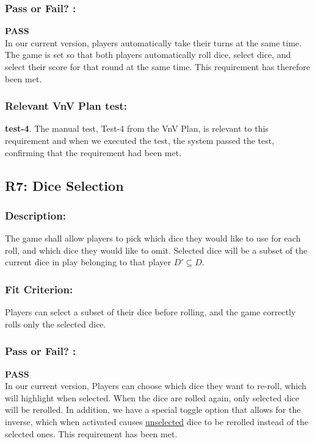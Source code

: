 \documentclass[12pt, titlepage]{article}
\begin{document}
\subsubsection*{Pass or Fail? :} 

 \noindent \textbf{PASS}\\
 
  In our current version, players automatically take their turns at the same time. The game is set so that both players automatically roll dice, select dice, and select their score for that round at the same time. This requirement has therefore been met.

\subsubsection*{Relevant VnV Plan test: } \textbf{test-4}.  The manual test, Test-4 from the VnV Plan, is relevant to this requirement and when we executed the test, the system passed the test, confirming that the requirement had been met.


\subsection{R7: Dice Selection} 
\label{R7} 

\subsubsection*{Description:} The game shall allow players to pick which dice they would like to use for each roll, and which dice they would like to omit. Selected dice will be a subset of the current dice in play belonging to that player $D' \subseteq D$.

\subsubsection*{Fit Criterion:} Players can select a subset of their dice before rolling, and the game correctly rolls only the selected dice.


\subsubsection*{Pass or Fail? :} 

 \noindent \textbf{PASS}\\
 
 In our current version, Players can choose which dice they want to re-roll, which will highlight when selected. When the dice are rolled again, only selected dice will be rerolled. In addition, we have a special toggle option that allows for the inverse, which when activated causes \underline{unselected} dice to be rerolled instead of the selected ones. This requirement has been met.
\end{document}
